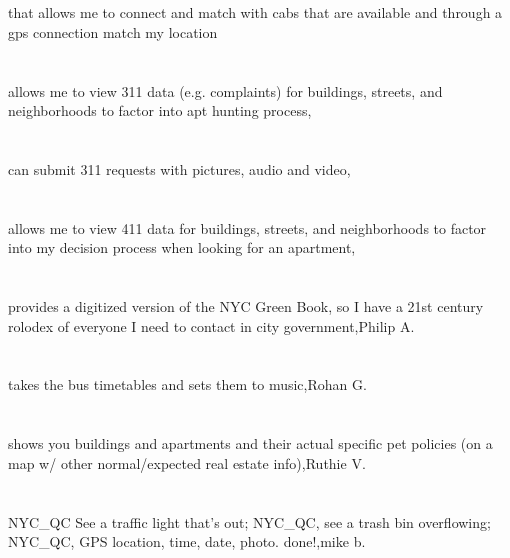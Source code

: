 \section{}    that allows me to connect and match with cabs that are available and through a gps connection match my location 	
\section{}allows me to view 311 data (e.g. complaints) for buildings, streets, and neighborhoods to factor into apt hunting process,	 
\section{}can submit 311 requests with pictures, audio and video,	
\section{}allows me to view 411 data for buildings, streets, and neighborhoods to factor into my decision process when looking for an apartment,	
\section{}provides a digitized version of the NYC Green Book, so I have a 21st century rolodex of everyone I need to contact in city government,Philip A.	
\section{}takes the bus timetables and sets them to music,Rohan G.	 
\section{}shows you buildings and apartments and their actual specific pet policies (on a map w/ other normal/expected real estate info),Ruthie V.	
\section{}NYC\_QC  See a traffic light that's out; NYC\_QC, see a trash bin overflowing; NYC\_QC,  GPS location, time, date, photo. done!,mike b.	

